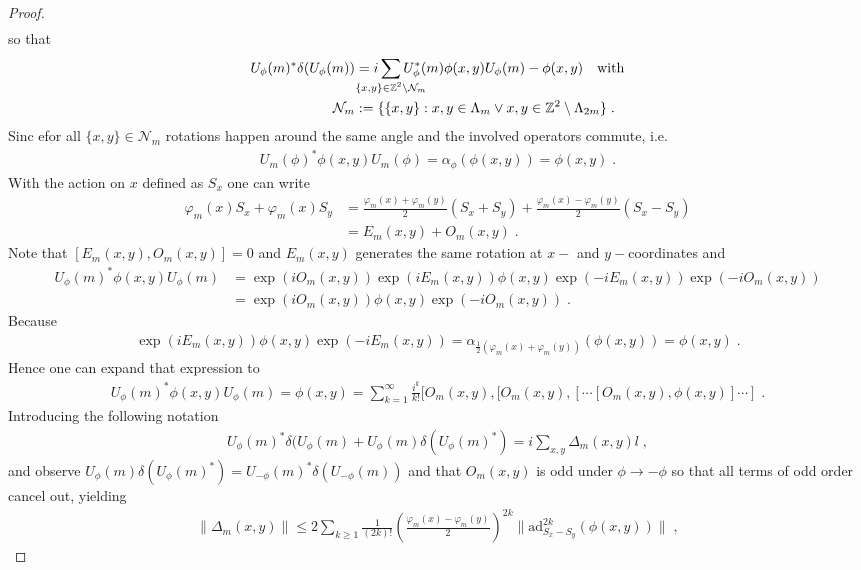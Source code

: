 \documentclass[
a4paper, %
11pt, %
onecolumn, %
openany, %
]{memoir}
\theoremstyle{definition}
\theoremstyle{remark}
\theoremstyle{plain}
\begin{document}
\begin{proof}
\begin{align}
\end{align}
so that \begin{align} U_{\phi}(m)^*\delta(U_{\phi}(m))&=i\sum_{\mathclap{\{x,y\}\in\mathbb{Z}^2\setminus \mathcal{N}_{m}}} U_{\phi}^*(m)\phi(x,y)U_{\phi}(m)-\phi(x,y)\quad \text{with}\\\mathcal{N}_m &:=\{\{x,y\}: x,y\in\Lambda_m \lor x,y\in\mathbb{Z}^2\setminus\Lambda_{2m}\} \;.
\end{align}
Sinc efor all $\{x,y\}\in\mathcal{N}_m$ rotations happen around the same angle and the involved operators commute, i.e. \begin{align}
U_m(\phi)^*\phi(x,y)U_m(\phi)=\alpha_{\phi}(\phi(x,y))=\phi(x,y)\;.
\end{align}
With the action on $x$ defined as $S_x$ one can write \begin{align}
\varphi_m(x)S_x+\varphi_m(x)S_y&=\frac{\varphi_m(x)+\varphi_m(y)}{2}(S_x+S_y)+\frac{\varphi_m(x)-\varphi_m(y)}{2}(S_x-S_y)\\ &= E_m(x,y)+O_m(x,y)\; .
\end{align}
Note that $[E_m(x,y),O_m(x,y)]=0$ and $E_m(x,y)$ generates the same rotation at $x-$ and $y-$coordinates and \begin{align}
U_{\phi}(m)^*\phi(x,y)U_{\phi}(m)&=\exp(i O_m(x,y))\exp(i E_m(x,y))\phi(x,y)\exp(-iE_m(x,y))\exp(-i O_m(x,y))\\
&= \exp(iO_m(x,y))\phi(x,y)\exp(-i O_m(x,y))\; .
\end{align}
Because \begin{align}
\exp(i E_m(x,y))\phi(x,y)\exp(-i E_m(x,y))=\alpha_{\frac{1}{2}(\varphi_m(x)+\varphi_m(y))}(\phi(x,y))=\phi(x,y)\; .
\end{align}
Hence one can expand that expression to \begin{align}
U_{\phi}(m)^*\phi(x,y)U_{\phi}(m) = \phi(x,y)=\sum_{k=1}^{\infty} \frac{i^k}{k!}[O_m(x,y),[O_m(x,y),[\cdots[O_m(x,y),\phi(x,y)]\cdots]\; . \label{eqn::merminproof}
\end{align}
Introducing the following notation \begin{align}
U_{\phi}(m)^*\delta(U_{\phi}(m)+U_{\phi}(m)\delta(U_{\phi}(m)^*)=i\sum_{x,y}\Delta_m(x,y)l\; ,
\end{align}
and observe $U_{\phi}(m)\delta(U_{\phi}(m)^*)=U_{-\phi}(m)^*\delta(U_{-\phi}(m))$ and  that $O_m(x,y)$ is odd under $\phi\rightarrow -\phi$ so that all terms of odd order cancel out, yielding \begin{align}
\| \Delta_m(x,y)\| \leq 2 \sum_{k\geq 1} \frac{1}{(2k)!}\left(\frac{\varphi_m(x)-\varphi_m(y)}{2}\right)^{2k} \| \mathrm{ad}_{S_x-S_y}^{2k}(\phi(x,y))\|\; ,

\end{align}
\end{proof}
\end{document}
